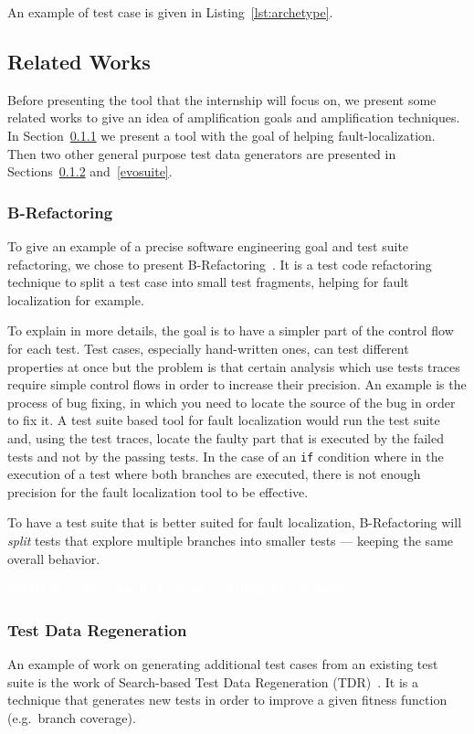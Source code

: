 \documentclass[11pt]{sdm}
\newcommand{\todo}[1]{\colorbox{Red!75}{\textcolor{white}{\textbf{TODO\ifx&#1&\else: #1\fi}}}}
\begin{document}
An example of test case is given in Listing~\ref{lst:archetype}.


\subsection{Related Works}
\label{related}
Before presenting the tool that the internship will focus on, we present some related works to give an idea of amplification goals and amplification techniques.
In Section~\ref{brefactoring} we present a tool with the goal of helping fault-localization.
Then two other general purpose test data generators are presented in Sections~\ref{tdr} and~\ref{evosuite}.

\subsubsection{B-Refactoring}
\label{brefactoring}
To give an example of a precise software engineering goal and test suite refactoring, we chose to present B-Refactoring~\cite{xuan2016b}.
It is a test code refactoring technique to split a test case into small test fragments, helping for fault localization for example.

To explain in more details, the goal is to have a simpler part of the control flow for each test.
Test cases, especially hand-written ones, can test different properties at once but the problem is that certain analysis which use tests traces require simple control flows in order to increase their precision.
An example is the process of bug fixing, in which you need to locate the source of the bug in order to fix it.
A test suite based tool for fault localization would run the test suite and, using the test traces, locate the faulty part that is executed by the failed tests and not by the passing tests.
In the case of an \texttt{if} condition where in the execution of a test where both branches are executed, there is not enough precision for the fault localization tool to be effective.

To have a test suite that is better suited for fault localization, B-Refactoring will \textit{split} tests that explore multiple branches into smaller tests --- keeping the same overall behavior.

\todo{explain the technique}

\subsubsection{Test Data Regeneration}
\label{tdr}
An example of work on generating additional test cases from an existing test suite is the work of Search-based Test Data Regeneration (TDR)~\cite{yoo2012test}.
It is a technique that generates new tests in order to improve a given fitness function (e.g.\ branch coverage).
\end{document}
